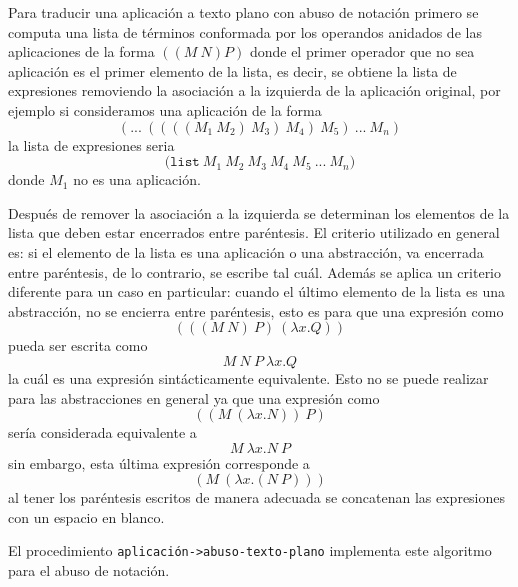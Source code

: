 \documentclass[letterpaper,twoside,openright,11pt]{book}
\begin{document}
Para traducir una aplicación a texto plano con abuso de notación primero se computa una lista de términos conformada por los operandos anidados de las aplicaciones de la forma \( ((M\ N) P) \) donde el primer operador que no sea aplicación es el primer elemento de la lista, es decir, se obtiene la lista de expresiones removiendo la asociación a la izquierda de la aplicación original, por ejemplo si consideramos una aplicación de la forma\[ (...\ ((((M_{1}\ M_{2})\ M_{3})\ M_{4})\ M_{5})\ ...\ M_{n}) \]la lista de expresiones seria\[ \mathtt{(list}\ M_{1}\ M_{2}\ M_{3}\ M_{4}\ M_{5}\ ...\ M_{n} \mathtt{)} \]donde \( M_{1} \) no es una aplicación.

Después de remover la asociación a la izquierda se determinan los elementos de la lista que deben estar encerrados entre paréntesis. El criterio utilizado en general es: si el elemento de la lista es una aplicación o una abstracción, va encerrada entre paréntesis, de lo contrario, se escribe tal cuál. Además se aplica un criterio diferente para un caso en particular: cuando el último elemento de la lista es una abstracción, no se encierra entre paréntesis, esto es para que una expresión como\[ (((M\ N)\ P)\ (λx.Q)) \]pueda ser escrita como\[ M\ N\ P\ λx.Q \]la cuál es una expresión sintácticamente equivalente. Esto no se puede realizar para las abstracciones en general ya que una expresión como\[ ((M\ (λx.N))\ P) \]sería considerada equivalente a\[ M\ λx.N\ P \]sin embargo, esta última expresión corresponde a\[ (M\ (λx.(N\ P))) \]al tener los paréntesis escritos de manera adecuada se concatenan las expresiones con un espacio en blanco.

El procedimiento {\tt{}\protect{}aplicación\protect{}->abuso-texto-plano} implementa este algoritmo para el abuso de notación.
\end{document}
